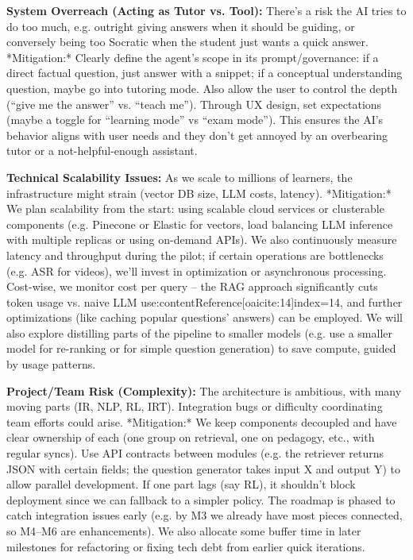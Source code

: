 \documentclass[11pt]{article}
\begin{document}
\textbf{System Overreach (Acting as Tutor vs. Tool):} There's a risk the AI tries to do too much, e.g. outright giving answers when it should be guiding, or conversely being too Socratic when the student just wants a quick answer. *Mitigation:* Clearly define the agent’s scope in its prompt/governance: if a direct factual question, just answer with a snippet; if a conceptual understanding question, maybe go into tutoring mode. Also allow the user to control the depth (“give me the answer” vs. “teach me”). Through UX design, set expectations (maybe a toggle for “learning mode” vs “exam mode”). This ensures the AI’s behavior aligns with user needs and they don’t get annoyed by an overbearing tutor or a not-helpful-enough assistant.

\textbf{Technical Scalability Issues:} As we scale to millions of learners, the infrastructure might strain (vector DB size, LLM costs, latency). *Mitigation:* We plan scalability from the start: using scalable cloud services or clusterable components (e.g. Pinecone or Elastic for vectors, load balancing LLM inference with multiple replicas or using on-demand APIs). We also continuously measure latency and throughput during the pilot; if certain operations are bottlenecks (e.g. ASR for videos), we’ll invest in optimization or asynchronous processing. Cost-wise, we monitor cost per query – the RAG approach significantly cuts token usage vs. naive LLM use:contentReference[oaicite:14]{index=14}, and further optimizations (like caching popular questions’ answers) can be employed. We will also explore distilling parts of the pipeline to smaller models (e.g. use a smaller model for re-ranking or for simple question generation) to save compute, guided by usage patterns.

\textbf{Project/Team Risk (Complexity):} The architecture is ambitious, with many moving parts (IR, NLP, RL, IRT). Integration bugs or difficulty coordinating team efforts could arise. *Mitigation:* We keep components decoupled and have clear ownership of each (one group on retrieval, one on pedagogy, etc., with regular syncs). Use API contracts between modules (e.g. the retriever returns JSON with certain fields; the question generator takes input X and output Y) to allow parallel development. If one part lags (say RL), it shouldn’t block deployment since we can fallback to a simpler policy. The roadmap is phased to catch integration issues early (e.g. by M3 we already have most pieces connected, so M4–M6 are enhancements). We also allocate some buffer time in later milestones for refactoring or fixing tech debt from earlier quick iterations.
\end{document}
